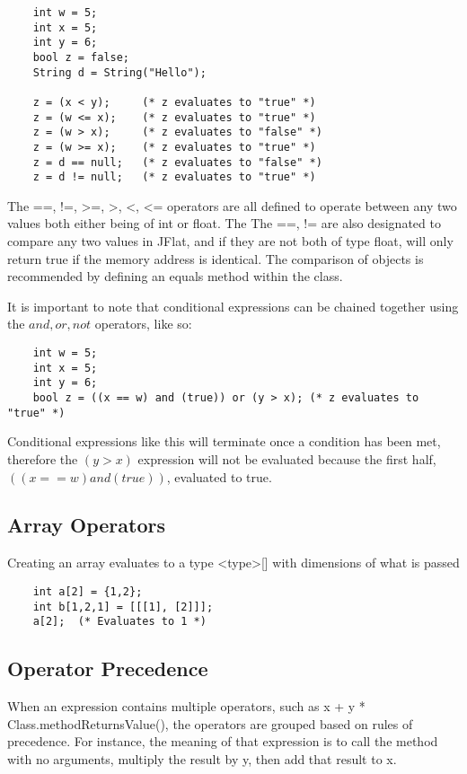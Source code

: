 \begin{homeworkProblem}
	\begin{verbatim}
	int w = 5;
	int x = 5;
	int y = 6;
	bool z = false;
	String d = String("Hello");
	
	z = (x < y);     (* z evaluates to "true" *)
	z = (w <= x);    (* z evaluates to "true" *)
	z = (w > x);     (* z evaluates to "false" *)
	z = (w >= x);    (* z evaluates to "true" *)
	z = d == null;   (* z evaluates to "false" *)
	z = d != null;   (* z evaluates to "true" *)
	\end{verbatim}
	
	The ==, !=, \textgreater=, \textgreater, \textless, \textless= operators are all defined to operate between any two values both either being of int or float. The The ==, != are also designated to compare any two values in JFlat, and if they are not both of type float, will only return true if the memory address is identical. The comparison of objects is recommended by defining an equals method within the class. 
	
	It is important to note that conditional expressions can be chained together using the $and, or, not$ operators, like so:
	\begin{verbatim}
	int w = 5;
	int x = 5;
	int y = 6;
	bool z = ((x == w) and (true)) or (y > x); (* z evaluates to "true" *)
	\end{verbatim}
	
	Conditional expressions like this will terminate once a condition has been met, therefore the $(y>x)$ expression will not be evaluated because the first half, $((x == w) and (true))$, evaluated to true.
	
	\subsection{Array Operators}
	Creating an array evaluates to a type \textless type\textgreater[] with dimensions of what is passed
	\begin{verbatim}
	int a[2] = {1,2};
	int b[1,2,1] = [[[1], [2]]];
	a[2];  (* Evaluates to 1 *)
	\end{verbatim}
	
	\subsection{Operator Precedence}
	
	When an expression contains multiple operators, such as x + y * Class.methodReturnsValue(), the operators are grouped based on rules of precedence. For instance, the meaning of that expression is to call the method with no arguments, multiply the result by y, then add that result to x. 
	

\end{homeworkProblem}
